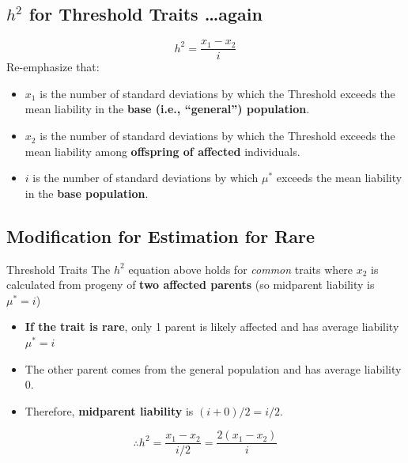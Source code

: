 \documentclass[10pt]{article}
\begin{document}
\subsection*{$h^2$ for Threshold Traits \dots again}
\[h^2 = \frac{x_1 - x_2}{i}\]
Re-emphasize that:
\begin{itemize}
	\item $x_1$ is the number of standard deviations by which the Threshold exceeds the mean liability in the \textbf{base (i.e., ``general'') population}.
	\item $x_2$ is the number of standard deviations by which the Threshold exceeds the mean liability among \textbf{offspring of affected} individuals.
	\item $i$ is the number of standard deviations by which $\mu^*$ exceeds the mean liability in the \textbf{base population}.
\end{itemize}

\subsection*{Modification for Estimation for \textbf{Rare}} Threshold Traits
The $h^2$ equation above holds for \textit{common} traits where $x_2$ is calculated from progeny of \textbf{two affected parents} (so midparent liability is $\mu^* = i$)
\begin{itemize}
	\item \textbf{If the trait is rare}, only 1 parent is likely affected and has average liability $\mu^* = i$
	\item The other parent comes from the general population and has average liability $0$.
	\item Therefore, \textbf{midparent liability} is $(i + 0) / 2 = i / 2$.
\end{itemize}
\[\therefore h^2 = \frac{x_1 - x_2}{i / 2} = \frac{2(x_1 - x_2)}{i}\]
\end{document}
